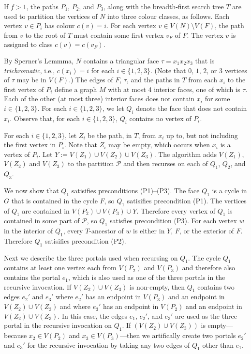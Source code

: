 \documentclass[kpfonts]{patmorin}
\begin{document}
If $f>1$, the paths $P_1$, $P_2$, and $P_3$, along with the breadth-first search tree $T$ are used to partition the vertices of $N$ into three colour classes, as follows.  Each vertex $v\in P_i$ has colour $c(v)=i$.  For each vertex $v\in V(N)\setminus V(F)$, the path from $v$ to the root of $T$ must contain some first vertex $v_F$ of $F$.  The vertex $v$ is assigned to class $c(v)=c(v_F)$.

By Sperner's Lemmma, $N$ contains a triangular face $\tau=x_1x_2x_3$ that is \emph{trichromatic}, i.e., $c(x_i)=i$ for each $i\in\{1,2,3\}$. (Note that $0$, $1$, $2$, or $3$ vertices of $\tau$ may be in $V(F)$.)  The edges of $F$, $\tau$, and the paths in $T$ from each $x_i$ to the first vertex of $P_i$ define a graph $M$ with at most 4 interior faces, one of which is $\tau$.  Each of the other (at most three) interior faces does not contain $x_i$ for some $i\in\{1,2,3\}$. For each $i\in\{1,2,3\}$, we let $Q_i$ denote the face that does not contain $x_i$. Observe that, for each $i\in\{1,2,3\}$, $Q_i$ contains no vertex of $P_i$.

For each $i\in\{1,2,3\}$, let $Z_i$ be the path, in $T$, from $x_i$ up to, but not including the first vertex in $P_i$.  Note that $Z_i$ may be empty, which occurs when $x_i$ is a vertex of $P_i$.  Let $Y:=V(Z_1)\cup V(Z_2)\cup V(Z_3)$.  The algorithm adds $V(Z_1)$, $V(Z_2)$ and $V(Z_3)$ to the partition $\mathcal{P}$ and then recurses on each of $Q_1$, $Q_2$, and $Q_3$.

We now show that $Q_1$ satisifies preconditions (P1)--(P3). The face $Q_1$ is a cycle in $G$ that is contained in the cycle $F$, so $Q_1$ satisifies precondition (P1).  The vertices of $Q_1$ are contained in $V(P_2)\cup V(P_3)\cup Y$.  Therefore every vertex of $Q_1$ is contained in some part of $\mathcal{P}$, so $Q_1$ satisfies precondition (P3).  For each vertex $w$ in the interior of $Q_1$, every $T$-ancestor of $w$ is either in $Y$, $F$, or the exterior of $F$.  Therefore $Q_1$ satisifies precondition (P2).

Next we describe the three portals used when recursing on $Q_1$.
The cycle $Q_1$ contains at least one vertex each from $V(P_2)$ and $V(P_3)$ and therefore also contains the portal $e_1$, which is also used as one of the three portals in the recursive invocation.  If $V(Z_2)\cup V(Z_3)$ is non-empty, then $Q_1$ contains two edges $e_2'$ and $e_3'$ where $e_2'$ has an endpoint in $V(P_3)$ and an endpoint in $V(Z_2)\cup V(Z_3)$ and where $e_3'$ has an endpoint in $V(P_2)$ and an endpoint in $V(Z_2)\cup V(Z_3)$.  In this case, the edges $e_1$, $e_2'$, and $e_3'$ are used as the three portal in the recursive invocation on $Q_1$.  If $(V(Z_2)\cup V(Z_3))$ is empty---because $x_2\in V(P_2)$ and $x_3\in V(P_3)$---then we artifically create two portals $e_2'$ and $e_3'$ for the recursive invocation by taking any two edges of $Q_1$ other than $e_1$.
\end{document}

